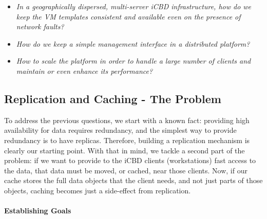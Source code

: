 \begin{itemize}
	\item \textit{In a geographically dispersed, multi-server iCBD infrastructure, how do we keep the VM templates consistent and available even on the presence of network faults?}
	\item \textit{How do we keep a simple management interface in a distributed platform?}
	\item \textit{How to scale the platform in order to handle a large number of clients and maintain or even enhance its performance?}
\end{itemize}




\subsection{Replication and Caching - The Problem}
\label{sec:intro_replication_cache_theproblem}

To address the previous questions, we start with a known fact: providing high availability for data requires redundancy, and the simplest way to provide redundancy is to have replicas. Therefore, building a replication mechanism is clearly our starting point. With that in mind, we tackle a second part of the problem: if we want to provide to the iCBD clients (workstations) fast access to the data, that data must be moved, or cached, near those clients. Now, if our cache stores the full data objects that the client needs, and not just parts of those objects, caching becomes just a side-effect from replication.


\paragraph{Establishing Goals}
\label{par:intro_motivation_goals}

